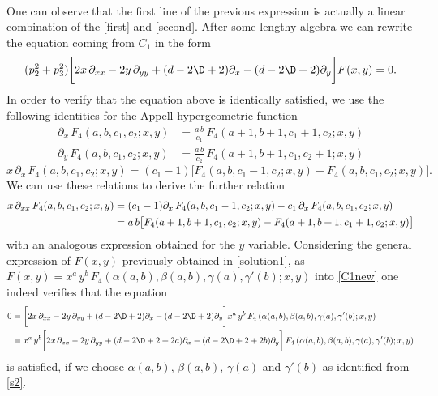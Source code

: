 \documentclass[a4paper,11pt,openright,twoside]{book}
\let\a=\alpha   \let\b=\beta   \let\g=\gamma   \let\d=\delta
\numberwithin{equation}{section}
\begin{document}
{\begin{equation}
\begin{aligned}
	\end{aligned}
\end{equation}
One can observe that the first line of the previous expression is actually a linear combination of the \eqref{first} and \eqref{second}. After some lengthy algebra we can rewrite the equation coming from $C_1$ in the form
\begin{equation}
	(p_2^2+p_3^2)\bigg[2x\,\partial_{xx}-2y\,\partial_{yy}+(d-2\D+2)\partial_x-(d-2\D+2)\partial_y\bigg]F(x,y)=0.\label{C1new}
\end{equation}
In order to verify that the equation above is identically satisfied,  we use the following identities for the Appell hypergeometric function 
\begin{align}
	\partial_x\,F_4(a,b,c_1,c_2;x,y)&=\frac{a\,b}{c_1}\,F_4(a+1,b+1,c_1+1,c_2;x,y)\\
	\partial_y\,F_4(a,b,c_1,c_2;x,y)&=\frac{a\,b}{c_2}\,F_4(a+1,b+1,c_1,c_2+1;x,y)
\end{align}
\begin{equation}
	x\,\partial_x\, F_4(a,b,c_1,c_2;x,y)= (c_1-1)\big[F_4(a,b,c_1-1,c_2;x,y)-F_4(a,b,c_1,c_2;x,y)\big].
\end{equation} 
We can use these relations to derive the further relation 
\begin{align}
	x\,\partial_{xx}\, F_4(a,b,c_1,c_2;x,y)&=(c_1-1) \partial_x\,F_4(a,b,c_1-1,c_2;x,y)-c_1\,\partial_x\,F_4(a,b,c_1,c_2;x,y)\notag\\
	&=a\,b\big[F_4(a+1,b+1,c_1,c_2;x,y)-F_4(a+1,b+1,c_1+1,c_2;x,y)\big]
\end{align}
with an analogous expression obtained for the $y$ variable. Considering the general expression of $F(x,y)$ previously obtained in \eqref{solution1}, as $F(x,y)=x^a\,y^b\,F_4\left(\a(a,b),\b(a,b),\gamma(a),\g'(b);x, y\right)$ into \eqref{C1new} one indeed verifies that the equation
\begin{equation}
	\begin{aligned}
		0&=\bigg[2x\,\partial_{xx}-2y\,\partial_{yy}+(d-2\D+2)\partial_x-(d-2\D+2)\partial_y\bigg]x^a\,y^b\,F_4\left(\a(a,b),\b(a,b),\gamma(a),\g'(b);x, y\right)\\
		&=x^a\,y^b\bigg[2x\,\partial_{xx}-2y\,\partial_{yy}+(d-2\D+2+2a)\partial_x-(d-2\D+2+2b)\partial_y\bigg]\,F_4\left(\a(a,b),\b(a,b),\gamma(a),\g'(b);x, y\right)
	\end{aligned}
\end{equation}
is satisfied, if we choose $\a(a,b)$, $\b(a,b)$, $\gamma(a)$ and $\g'(b)$ as identified from \eqref{s2}.

}
\end{document}
